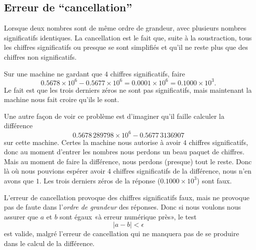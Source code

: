 \subsection{Erreur de ``cancellation''}

Lorsque deux nombres sont de même ordre de grandeur, avec plusieurs nombres significatifs identiques. La cancellation est le fait que, suite à la soustraction, tous les chiffres significatifs ou presque se sont simplifiés et qu'il ne reste plus que des chiffres non significatifs.

\begin{example}
    Sur une machine ne gardant que \( 4\) chiffres significatifs, faire
    \begin{equation}
        0.5678\times 10^6-0.5677\times 10^6 = 0.0001\times 10^6=0.1000\times 10^3.
    \end{equation}
    Le fait est que les trois derniers zéros ne sont pas significatifs, mais maintenant la machine nous fait croire qu'ils le sont.

    Une autre façon de voir ce problème est d'imaginer qu'il faille calculer la différence 
    \begin{equation}
        0.5678\,289798\times 10^6 - 0.5677\,3136907
    \end{equation}
    sur cette machine. Certes la machine nous autorise à avoir \( 4\) chiffres significatifs, donc au moment d'entrer les nombres nous perdons un beau paquet de chiffres. Mais au moment de faire la différence, nous perdons (presque) tout le reste. Donc là où nous pouvions espérer avoir \( 4\) chiffres significatifs de la différence, nous n'en avons que \( 1\). Les trois derniers zéros de la réponse (\( 0.1000\times 10^3\)) sont faux.
\end{example}

\begin{remark}  \label{REMooRQIJooNLdAZE}
    L'erreur de cancellation provoque des chiffres significatifs faux, mais ne provoque pas de faute dans l'\emph{ordre de grandeur} des réponses. Donc si nous voulons nous assurer que \( a\) et \( b\) sont égaux «à erreur numérique près», le test
    \begin{equation}
        | a-b |<\epsilon
    \end{equation}
    est valide, malgré l'erreur de cancellation qui ne manquera pas de se produire dans le calcul de la différence.
\end{remark}

